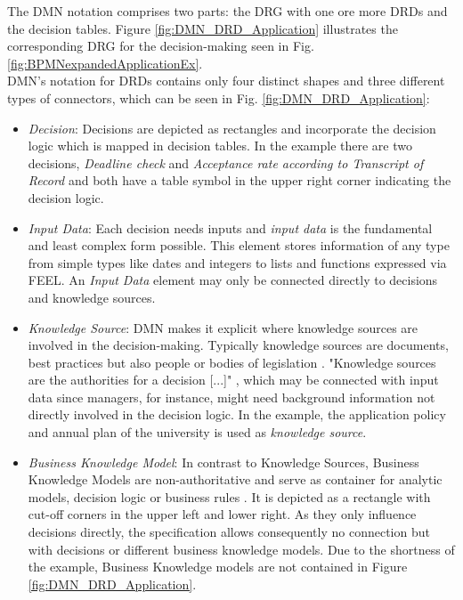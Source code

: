 The DMN notation comprises two parts: the \acl{DRG} with one ore more \aclp{DRD} and the decision tables. Figure \ref{fig:DMN_DRD_Application} illustrates the corresponding \ac{DRG} for the decision-making seen in Fig. \ref{fig:BPMNexpandedApplicationEx}.
\\
DMN's notation for DRDs contains only four distinct shapes and three different types of connectors, which can be seen in Fig. \ref{fig:DMN_DRD_Application}: 

\begin{itemize}
\item \textit{Decision}: Decisions are depicted as rectangles and incorporate the decision logic which is mapped in decision tables. In the example there are two decisions, \textit{Deadline check} and \textit{Acceptance rate according to Transcript of Record} and both have a table symbol in the upper right corner indicating the decision logic. 
\item \textit{Input Data}: Each decision needs inputs and \textit{input data} is the fundamental and least complex form possible. This element stores information of any type from simple types like dates and integers to lists and functions expressed via \acf{FEEL}. An \textit{Input Data} element may only be connected directly to decisions and knowledge sources. 
\item \textit{Knowledge Source}: DMN makes it explicit where knowledge sources are involved in the decision-making. Typically knowledge sources are documents, best practices but also people or bodies of legislation \cite{DMNspec2016}.  "Knowledge sources are the authorities for a decision [...]" \cite{DMNmicroguide}, which may be connected with input data since managers, for instance, might need background information not directly involved in the decision logic. In the example, the application policy and annual plan of the university is used as \textit{knowledge source}.
\item \textit{Business Knowledge Model}: In contrast to Knowledge Sources, Business Knowledge Models are non-authoritative and serve as container for analytic models, decision logic or business rules \cite{DMNspec2016}. It is depicted as a rectangle with cut-off corners in the upper left and lower right. As they only influence decisions directly, the specification allows consequently no connection but with decisions or different business knowledge models. Due to the shortness of the example, Business Knowledge models are not contained in Figure  \ref{fig:DMN_DRD_Application}. 
\end{itemize}

